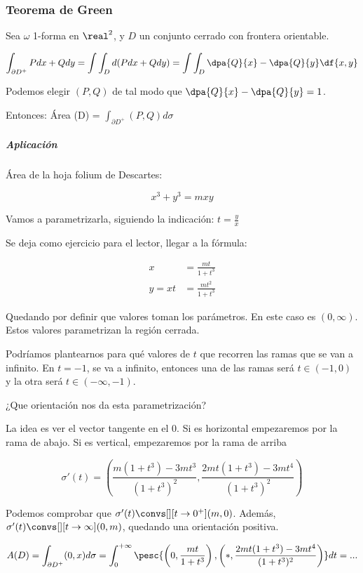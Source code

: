 \subsubsection{Teorema de Green}
Sea $\omega$ 1-forma en $\real^2$, y $D$ un conjunto cerrado con frontera orientable.

\[
\int_{\partial  D^+} Pdx+Qdy = \int \int_D d(Pdx+Qdy) = \int\int_D \dpa{Q}{x} - \dpa{Q}{y}\df{x,y}
\]

\obs Podemos elegir $(P,Q)$ de tal modo que $\displaystyle \dpa{Q}{x}-\dpa{Q}{y} = 1$.

Entonces: Área (D) = $\displaystyle\int_{\partial  D^+} (P,Q)d\sigma$

\subparagraph{Aplicación} Área de la hoja folium de Descartes:

\[x^3+y^3 = mxy\]



Vamos a parametrizarla, siguiendo la indicación: $t = \frac{y}{x}$

Se deja como ejercicio para el lector, llegar a la fórmula:

\[\begin{array}{cc}
x&=\displaystyle\frac{mt}{1+t^3}\\
y= xt &= \displaystyle\frac{mt^2}{1+t^3}
\end{array}\]

Quedando por definir que valores toman los parámetros. En este caso es $(0,\infty)$. Estos valores parametrizan la región cerrada. 

Podríamos plantearnos para qué valores de $t$ que recorren las ramas que se van a infinito. En $t=-1$, se va a infinito, entonces una de las ramas será $t\in(-1,0)$ y la otra será $t\in(-\infty,-1)$.

¿Que orientación nos da esta parametrización?

La idea es ver el vector tangente en el 0. Si es horizontal empezaremos por la rama de abajo. Si es vertical, empezaremos por la rama de arriba

\[\sigma'(t) = \left(\frac{m(1+t^3)-3mt^3}{(1+t^3)^2},\frac{2mt(1+t^3) - 3mt^4}{(1+t^3)^2}\right)\]

Podemos comprobar que $\sigma'(t) \convs[][t\to 0^+] (m,0)$. Además, $\sigma'(t) \convs[][t\to\infty](0,m)$, quedando una orientación positiva.

\[
A(D) = \int_{\partial  D^+} (0,x)d\sigma = \int_0^{+\infty} \pesc{\left(0,\frac{mt}{1+t^3}\right), \left(\ast,\frac{2mt(1+t^3)-3mt^4}{(1+t^3)^2}\right)}dt = ...
\]

